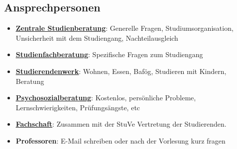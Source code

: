 \documentclass[
	aspectratio=169, 
	10pt 
]{beamer}
\begin{document}
\subsection{Ansprechpersonen}
\begin{frame}{\insertsubsection}
    \begin{itemize}
        \item \underline{\textbf{\href{https://www.uni-ulm.de/studium/studienberatung/zentrale-studienberatung/}{Zentrale Studienberatung}}}: Generelle Fragen, Studiumsorganisation, Unsicherheit mit dem Studiengang, Nachteilausgleich  
        \item \underline{\textbf{\href{https://www.uni-ulm.de/studium/studienberatung/studienfachberatung/}{Studienfachberatung}}}: Spezifische Fragen zum Studiengang 
        \item \underline{\textbf{\href{https://studierendenwerk-ulm.de/}{Studierendenwerk}}}: Wohnen, Essen, Bafög, Studieren mit Kindern, Beratung
        \item \underline{\textbf{\href{https://studierendenwerk-ulm.de/beratung-betreuung/psychosoziale-beratung/}{Psychosozialberatung}}}: Kostenlos, persönliche Probleme, Lernschwierigkeiten, Prüfungsängste, etc
        \item \underline{\textbf{\href{https://stuve.uni-ulm.de/fin/aktuelles}{Fachschaft}}}: {Zusammen mit der StuVe Vertretung der Studierenden. }
        \item \textbf{Professoren}: E-Mail schreiben oder nach der Vorlesung kurz fragen
    \end{itemize}
\end{frame}
\end{document}
